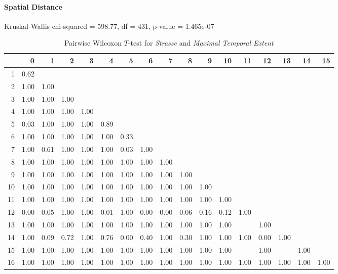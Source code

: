 \paragraph{Spatial Distance}
Kruskal-Wallis chi-squared = 598.77, df = 431, p-value = 1.465e-07

\begin{table}[ht!]
	\tiny
	\setlength{\tabcolsep}{4pt}
	\centering
  \begin{tabular}{rrrrrrrrrrrrrrrrr}
    \hline
   & 0 & 1 & 2 & 3 & 4 & 5 & 6 & 7 & 8 & 9 & 10 & 11 & 12 & 13 & 14 & 15 \\ 
    \hline
  1 & 0.62 &  &  &  &  &  &  &  &  &  &  &  &  &  &  &  \\ 
    2 & 1.00 & 1.00 &  &  &  &  &  &  &  &  &  &  &  &  &  &  \\ 
    3 & 1.00 & 1.00 & 1.00 &  &  &  &  &  &  &  &  &  &  &  &  &  \\ 
    4 & 1.00 & 1.00 & 1.00 & 1.00 &  &  &  &  &  &  &  &  &  &  &  &  \\ 
    5 & 0.03 & 1.00 & 1.00 & 1.00 & 0.89 &  &  &  &  &  &  &  &  &  &  &  \\ 
    6 & 1.00 & 1.00 & 1.00 & 1.00 & 1.00 & 0.33 &  &  &  &  &  &  &  &  &  &  \\ 
    7 & 1.00 & 0.61 & 1.00 & 1.00 & 1.00 & 0.03 & 1.00 &  &  &  &  &  &  &  &  &  \\ 
    8 & 1.00 & 1.00 & 1.00 & 1.00 & 1.00 & 1.00 & 1.00 & 1.00 &  &  &  &  &  &  &  &  \\ 
    9 & 1.00 & 1.00 & 1.00 & 1.00 & 1.00 & 1.00 & 1.00 & 1.00 & 1.00 &  &  &  &  &  &  &  \\ 
    10 & 1.00 & 1.00 & 1.00 & 1.00 & 1.00 & 1.00 & 1.00 & 1.00 & 1.00 & 1.00 &  &  &  &  &  &  \\ 
    11 & 1.00 & 1.00 & 1.00 & 1.00 & 1.00 & 1.00 & 1.00 & 1.00 & 1.00 & 1.00 & 1.00 &  &  &  &  &  \\ 
    12 & 0.00 & 0.05 & 1.00 & 1.00 & 0.01 & 1.00 & 0.00 & 0.00 & 0.06 & 0.16 & 0.12 & 1.00 &  &  &  &  \\ 
    13 & 1.00 & 1.00 & 1.00 & 1.00 & 1.00 & 1.00 & 1.00 & 1.00 & 1.00 & 1.00 & 1.00 &  & 1.00 &  &  &  \\ 
    14 & 1.00 & 0.09 & 0.72 & 1.00 & 0.76 & 0.00 & 0.40 & 1.00 & 0.30 & 1.00 & 1.00 & 1.00 & 0.00 & 1.00 &  &  \\ 
    15 & 1.00 & 1.00 & 1.00 & 1.00 & 1.00 & 1.00 & 1.00 & 1.00 & 1.00 & 1.00 & 1.00 &  & 1.00 &  & 1.00 &  \\ 
    16 & 1.00 & 1.00 & 1.00 & 1.00 & 1.00 & 1.00 & 1.00 & 1.00 & 1.00 & 1.00 & 1.00 & 1.00 & 1.00 & 1.00 & 1.00 & 1.00 \\ 
     \hline
  \end{tabular}
	\caption{Pairwise Wilcoxon $T$-test for \textit{Strasse} and \textit{Maximal Temporal Extent}}
	\label{tbl:wilcoxon_baysis_matched_Strasse_TMax}
\end{table}
